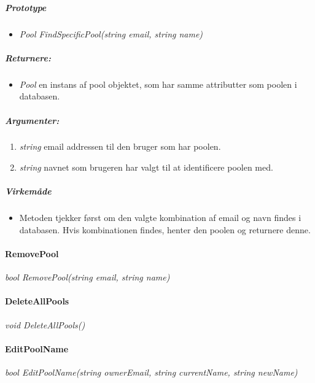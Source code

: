 \subparagraph{Prototype}
\begin{itemize}
	\item \textit{Pool FindSpecificPool(string email, string name)}
\end{itemize}

\subparagraph{Returnere:}
\begin{itemize}
	\item \textit{Pool} en instans af pool objektet, som har samme attributter som poolen i databasen.
\end{itemize}

\subparagraph{Argumenter:}
\begin{enumerate}
	\item \textit{string} email addressen til den bruger som har poolen.
	\item \textit{string} navnet som brugeren har valgt til at identificere poolen med.
\end{enumerate}

\subparagraph{Virkemåde}
\begin{itemize}
	\item Metoden tjekker først om den valgte kombination af email og navn findes i databasen. Hvis kombinationen findes, henter den poolen og returnere denne.
\end{itemize}








\paragraph{RemovePool}%

\textit{bool RemovePool(string email, string name)}

\paragraph{DeleteAllPools}%

\textit{void DeleteAllPools()}

\paragraph{EditPoolName}%

\textit{bool EditPoolName(string ownerEmail, string currentName, string newName)}

